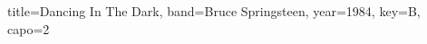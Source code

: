 \documentclass{skrul-leadsheet}
\begin{document}
\begin{song}[transpose-capo=true]{title={Dancing In The Dark}, band={Bruce Springsteen}, year={1984}, key={B}, capo={2}}



\end{song}
\end{document}
